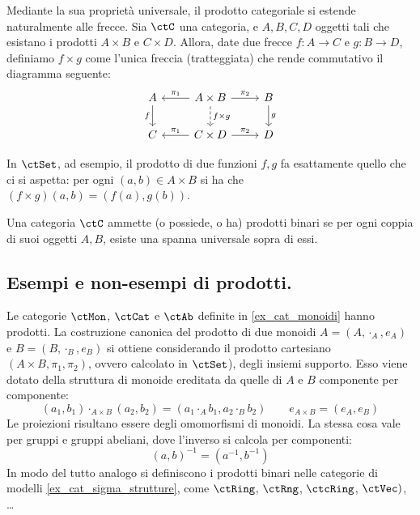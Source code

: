 \medskip	
Mediante la sua proprietà universale, il prodotto categoriale si estende naturalmente alle frecce. Sia \(\ctC\) una categoria, e \(A,B,C,D\) oggetti tali che esistano i prodotti \(A\times B\) e \(C\times D\). Allora, date due frecce \(f\colon A\to C\) e \(g\colon B\to D\), definiamo \(f\times g\) come l'unica freccia (tratteggiata) che rende commutativo il diagramma seguente:
\begin{equation}
	\begin{aligned}
\begin{tikzcd}
	A\ar[d, "f"']&A\times B\ar[l, "\pi_1"']\ar[r, "\pi_2"]\ar[d, "f\times g", dashed]&B\ar[d, "g"]
	\\
	C&C\times D\ar[l, "\pi_1"']\ar[r, "\pi_2"]&D
\end{tikzcd}
	\end{aligned}
\end{equation}

In \(\ctSet\), ad esempio, il prodotto di due funzioni \(f,g\) fa esattamente quello che ci si aspetta: per ogni \((a,b)\in A\times B\) si ha che \((f\times g)(a,b)=(f(a),g(b))\).

\begin{definition}\label{def_cat_con_prodotti}
	Una categoria \(\ctC\) ammette (o possiede, o ha) prodotti binari se per ogni coppia di suoi oggetti \(A,B\), esiste una spanna universale sopra di essi.
\end{definition}

\subsection{Esempi e non-esempi di prodotti.}
\begin{example}  
	Le categorie \(\ctMon\), \(\ctCat\) e \(\ctAb\) definite in \ref{ex_cat_monoidi} hanno prodotti. La costruzione canonica del prodotto di due monoidi \(A=(A, \cdot_A, e_A)\) e \(B=(B, \cdot_B, e_B)\)   si ottiene considerando il prodotto cartesiano \((A\times B,\pi_1, \pi_2)\), ovvero calcolato in \(\ctSet\)), degli insiemi supporto. Esso viene dotato della struttura di monoide ereditata da quelle di \(A\) e \(B\) componente per componente:
	\[
	(a_1,b_1)\cdot_{A \times B} (a_2,b_2)=(a_1\cdot_A b_1, a_2\cdot_B b_2)\qquad e_{A\times B}=(e_A,e_B)
	\]
	Le proiezioni risultano essere degli omomorfismi di monoidi.
	La stessa cosa vale per gruppi e gruppi abeliani, dove l'inverso si calcola per componenti: 
	\[
	(a,b)^{-1}=(a^{-1},b^{-1})
	\]
	In modo del tutto analogo si definiscono i prodotti binari nelle categorie di modelli  \ref{ex_cat_sigma_strutture}, come \(\ctRing\), \(\ctRng\), \(\ctcRing\), \(\ctVec)\), \dots 
\end{example}


